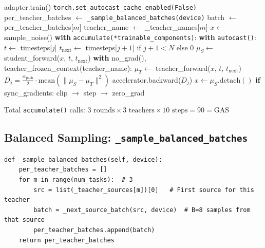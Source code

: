 \documentclass[11pt]{article}
\begin{document}
\begin{algorithm}[H]
\caption{DiffusionOPD optimize() --- Algorithm 1}
\begin{algorithmic}
\STATE adapter.train()
\STATE \texttt{torch.set\_autocast\_cache\_enabled(False)} 
    \STATE per\_teacher\_batches $\leftarrow$ \texttt{\_sample\_balanced\_batches(device)}
    \STATE {}
        \STATE batch $\leftarrow$ per\_teacher\_batches[$m$]
        \STATE teacher\_name $\leftarrow$ \_teacher\_names[$m$]
        \STATE $x \leftarrow$ sample\_noise() 
            \STATE \textbf{with} \texttt{accumulate(*trainable\_components)}:
            \STATE \quad \textbf{with} \texttt{autocast()}:
            \STATE \quad\quad $t \leftarrow$ timesteps[$j$]
            \STATE \quad\quad $t_\text{next} \leftarrow$ timesteps[$j+1$] if $j+1 < N$ else 0
            \STATE \quad\quad $\mu_S \leftarrow$ student\_forward($x$, $t$, $t_\text{next}$) 
            \STATE \quad\quad \textbf{with} no\_grad(), teacher\_frozen\_context(teacher\_name):
            \STATE \quad\quad\quad $\mu_T \leftarrow$ teacher\_forward($x$, $t$, $t_\text{next}$) 
            \STATE \quad\quad $D_j = \tfrac{\alpha_\text{path}}{2} \cdot \text{mean}(\|\mu_S - \mu_T\|^2)$
            \STATE \quad accelerator.backward($D_j$) 
            \STATE \quad $x \leftarrow \mu_S.\text{detach}()$ 
            \STATE \quad \textbf{if} sync\_gradients: clip $\to$ step $\to$ zero\_grad
        \ENDFOR
    \ENDFOR
\ENDFOR
\end{algorithmic}
\end{algorithm}

Total \texttt{accumulate()} calls: $3 \text{ rounds} \times 3 \text{ teachers} \times 10 \text{ steps} = 90 = \text{GAS}$ \checkmark

\subsection{Balanced Sampling: \texttt{\_sample\_balanced\_batches}}

\begin{lstlisting}
def _sample_balanced_batches(self, device):
    per_teacher_batches = []
    for m in range(num_tasks):  # 3
        src = list(_teacher_sources[m])[0]   # First source for this teacher
        batch = _next_source_batch(src, device)  # B=8 samples from that source
        per_teacher_batches.append(batch)
    return per_teacher_batches
\end{lstlisting}
\end{document}
